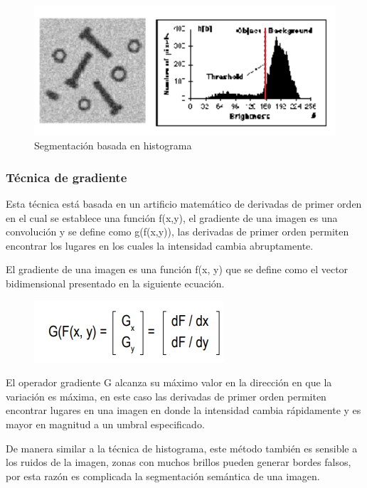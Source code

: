 \documentclass[conference,compsoc]{IEEEtran}
\begin{document}
\begin{figure}[H]
\centering
\includegraphics[scale=0.5]{histograma.png}
\caption{\label{fig:histograma}Segmentación basada en histograma}
\end{figure}

\subsubsection{Técnica de gradiente}
Esta técnica está basada en un artificio matemático de derivadas de primer orden en el cual se establece una función f(x,y), el gradiente de una imagen es una convolución y se define como g(f(x,y)), las derivadas de primer orden permiten encontrar los lugares en los cuales la intensidad cambia abruptamente.

El gradiente de una imagen es una función f(x, y) que se define como el vector bidimensional presentado en la siguiente ecuación.

\begin{figure}[H]
\centering
\includegraphics[scale=0.7]{ecgradiente.png}
\end{figure}

El operador gradiente G alcanza su máximo valor en la dirección en que la variación es máxima, en este caso las derivadas de primer orden permiten encontrar lugares en una imagen en donde la intensidad cambia rápidamente y es mayor en magnitud a un umbral especificado. 

De manera similar a la técnica de histograma, este método también es sensible a los ruidos de la imagen, zonas con muchos brillos pueden generar bordes falsos, por esta razón es complicada la segmentación semántica de una imagen.
\end{document}
